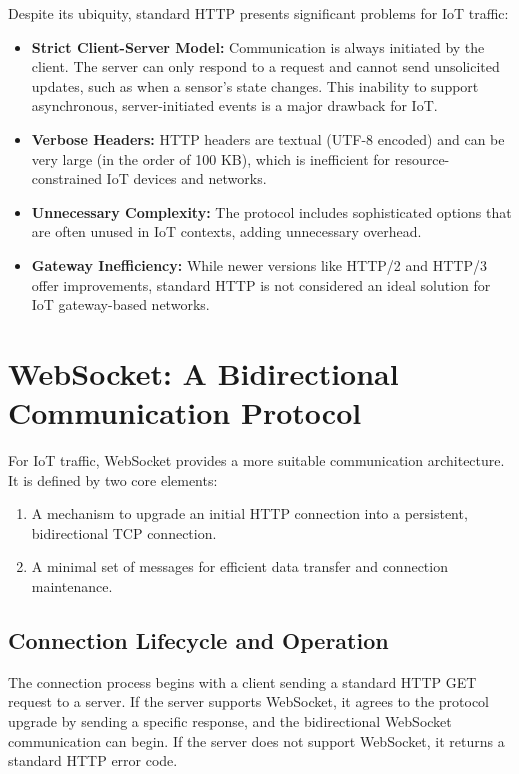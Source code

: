 \documentclass[a4paper, 12pt]{book} %
\begin{document}
Despite its ubiquity, standard HTTP presents significant problems for
IoT traffic:

\begin{itemize}
\tightlist
\item
  \textbf{Strict Client-Server Model:} Communication is always initiated
  by the client. The server can only respond to a request and cannot
  send unsolicited updates, such as when a sensor's state changes. This
  inability to support asynchronous, server-initiated events is a major
  drawback for IoT.
\item
  \textbf{Verbose Headers:} HTTP headers are textual (UTF-8 encoded) and
  can be very large (in the order of 100 KB), which is inefficient for
  resource-constrained IoT devices and networks.
\item
  \textbf{Unnecessary Complexity:} The protocol includes sophisticated
  options that are often unused in IoT contexts, adding unnecessary
  overhead.
\item
  \textbf{Gateway Inefficiency:} While newer versions like HTTP/2 and
  HTTP/3 offer improvements, standard HTTP is not considered an ideal
  solution for IoT gateway-based networks.
\end{itemize}

\section{WebSocket: A Bidirectional Communication
Protocol}\label{websocket-a-bidirectional-communication-protocol}

For IoT traffic, WebSocket provides a more suitable communication
architecture. It is defined by two core elements:

\begin{enumerate}
\def\labelenumi{\arabic{enumi}.}
\tightlist
\item
  A mechanism to upgrade an initial HTTP connection into a persistent,
  bidirectional TCP connection.
\item
  A minimal set of messages for efficient data transfer and connection
  maintenance.
\end{enumerate}

\subsection{Connection Lifecycle and
Operation}\label{connection-lifecycle-and-operation}

The connection process begins with a client sending a standard HTTP GET
request to a server. If the server supports WebSocket, it agrees to the
protocol upgrade by sending a specific response, and the bidirectional
WebSocket communication can begin. If the server does not support
WebSocket, it returns a standard HTTP error code.
\end{document}

